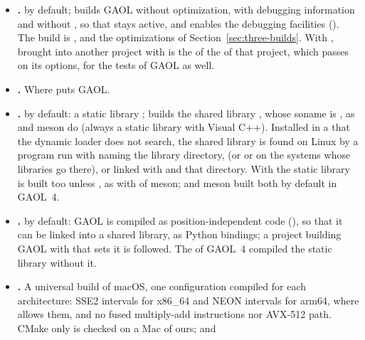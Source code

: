 \begin{itemize}
\item[$\bullet$] \textbf{.}  by
  default;  builds GAOL without optimization, with debugging
  information and without , so that  stays
  active, and enables the debugging facilities
  (). The  build is
  ,  and the optimizations of
  Section~\ref{sec:three-builds}. With ,
   brought into another project with
   is the  of the
   of that project, which passes on its options, for the tests
  of GAOL as well.
\item[$\bullet$] \textbf{.} Where
   puts GAOL.
\item[$\bullet$] \textbf{.}  by default:
  a static library ;  builds the shared library
  , whose soname is , as
   and meson do (always a static library with Visual C++).
  Installed in a  that the dynamic loader does not search, the
  shared library is found on Linux by a program run with 
  naming the library directory,  (or  or
   on the systems whose libraries go there), or linked
  with  and that directory.
  With  the static library is built too unless
  , as with  of
  meson;  and meson built both by default in
  GAOL~4.\newinvfive
\item[$\bullet$] \textbf{.}
   by default: GAOL is compiled as position-independent code
  (), so that it can be linked into a shared library, as
  Python bindings; a project building GAOL with  that sets
  it is followed. The  of GAOL~4 compiled the static library
  without it.\newinvfive
\item[$\bullet$] \textbf{.} A universal
  build of macOS, one configuration compiled for each architecture: SSE2
  intervals for x86\_64 and NEON intervals for arm64, where
   allows them, and no fused multiply-add instructions nor
  AVX-512 path. CMake only is checked on a Mac of ours;  and

\end{itemize}
